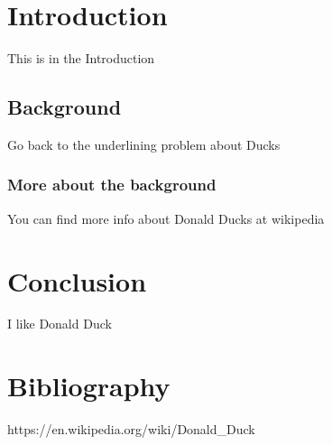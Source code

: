\documentclass[titlepage, english]{thesis}
\begin{document}
\begin{titlepage}
\maketitle
\end{titlepage}

\begin{abstract}{english}
This is the abstract. Blah blah blah...
\end{abstract}

\begin{abstract}{swedish}
ett sammandrag 
\end{abstract}

\begin{abstract}{finnish}
Samma p\aa\  finska
\end{abstract}


\tableofcontents


\section{Introduction}
This is in the Introduction
\subsection{Background}
Go back to the underlining problem about Ducks
\subsubsection{More about the background}
You can find more info about Donald Ducks at wikipedia  \cite{kalle} 

\newpage

\section {Conclusion}
I like Donald Duck



\section{Bibliography}

\begin{thebibliography}{99}

 https://en.wikipedia.org/wiki/Donald\_Duck

\end{thebibliography}
\end{document}
